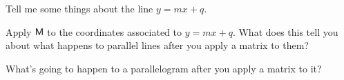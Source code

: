 \begin{prob}
Tell me some things about the line $y = mx + q$. 
\end{prob}

\begin{prob}
Apply  $\mathsf{M}$ to the coordinates associated to $y = mx + q$. What does this tell you about what happens to parallel lines after you apply a matrix to them?
\end{prob}


\begin{prob}
What's going to happen to a parallelogram after you apply a matrix to
it?
\end{prob}
